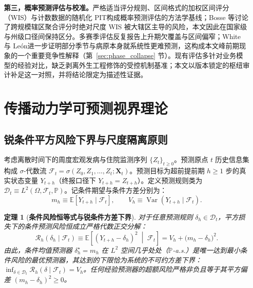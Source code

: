 \documentclass[10pt,UTF8,a4paper,zihao=-4]{ctexart}
\theoremstyle{plain}
\newtheorem{theorem}{定理}
\theoremstyle{remark}
\begin{document}
\textbf{第三，概率预测评估与校准。}严格适当评分规则\citep{gneiting2007strictly}、区间格式的加权区间评分（WIS）\citep{bracher2021evaluating}与计数数据的随机化 PIT\citep{czado2009predictive}构成概率预测评估的方法学基线；Bosse 等\citep{bosse2023scoring}讨论了跨规模辖区聚合评分时绝对尺度 WIS 被大辖区主导的风险，本文因此在国家级与州级口径间保持区分。多赛季评估反复报告上升期欠覆盖与区间偏窄\citep{mcgowan2019collaborative, flusight2024evaluation, cramer2022evaluation}；White 与 Le\'on\citep{white2026forecastability}进一步证明部分季节与病原本身就系统性更难预测，这构成本文峰前期现象的一个重要竞争性解释（第~\ref{sec:phase_collapse} 节）。现有评估多针对业务模型的经验对比，缺乏剥离外生工程修饰的受控机制基准；本文以版本锁定的枢纽审计补足这一对照，并将结论限定为描述性证据。

\section{传播动力学可预测视界理论}\label{sec:theory}

\subsection{锐条件平方风险下界与尺度隔离原则}\label{sec:risk_floor}

考虑离散时间下的周度宏观发病与住院监测序列 $\{Z_t\}_{t \ge 0}$。预测原点 $t$ 历史信息集构成 $\sigma$-代数流 $\mathcal{F}_t = \sigma(Z_0, Z_1, \dots, Z_t; \mathbf{X}_t)$。预测目标为超前提前期 $h \ge 1$ 步的真实状态变量 $Y_{t+h}$（终报口径下 $Y_{t+h} = Z_{t+h}$）。定义预测规则类为 $\mathcal{D}_t \equiv L^2(\Omega, \mathcal{F}_t, \mathbb{P})$。记条件期望与条件方差分别为：
\begin{equation}
m_h \equiv \mathbb{E}[Y_{t+h} \mid \mathcal{F}_t], \qquad V_h \equiv \operatorname{Var}(Y_{t+h} \mid \mathcal{F}_t).
\end{equation}

\begin{theorem}[\textbf{条件风险恒等式与锐条件方差下界}]\label{thm:sharp_floor}
对于任意预测规则 $\delta_h \in \mathcal{D}_t$，平方损失下的条件预测风险恒成立严格代数正交分解：
\begin{equation}
\mathcal{R}_h(\delta_h \mid \mathcal{F}_t) \equiv \mathbb{E}\left[(Y_{t+h} - \delta_h)^2 \;\middle|\; \mathcal{F}_t\right] = V_h + \bigl(m_h - \delta_h\bigr)^2. \label{eq:sharp_floor_identity}
\end{equation}
由此，条件均值预测器 $\delta_h^\star = m_h$ 在 $L^2$ 空间几乎处处（$\mathbb{P}$-a.s.）是唯一达到最小条件风险的最优预测器，其达到的下限恰为系统的不可约方差下界：$\inf_{\delta \in \mathcal{D}_t} \mathcal{R}_h(\delta \mid \mathcal{F}_t) = V_h$。任何经验预测器的超额风险严格非负且等于其平方偏差 $(m_h - \delta_h)^2 \ge 0$。
\end{theorem}
\end{document}
